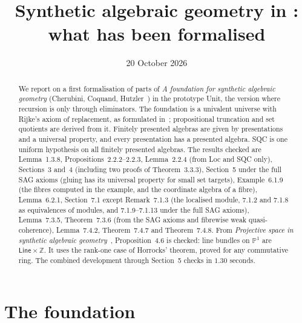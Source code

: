 \documentclass[11pt]{article}
\title{Synthetic algebraic geometry in \sys:\\what has been formalised}
\author{}
\date{20 October 2026}
\newcommand{\sys}{\textsf{Unit}\xspace}
\newcommand{\PP}{\mathbb{P}^1}
\theoremstyle{remark}
\begin{document}
\maketitle

\begin{abstract}
\noindent
We report on a first formalisation of parts of \emph{A foundation for
synthetic algebraic geometry} (Cherubini, Coquand, Hutzler~\cite{SAG})
in the prototype \sys, the version where recursion is only through
eliminators. The foundation is a univalent universe with Rijke's axiom
of replacement, as formulated in~\cite{CavCoq}; propositional truncation
and set quotients are derived from it. Finitely presented algebras are
given by presentations and a universal property, and every presentation
has a presented algebra. SQC is one uniform hypothesis on all finitely
presented algebras. The results checked are Lemma~1.3.8,
Propositions~2.2.2--2.2.3, Lemma~2.2.4 (from Loc and SQC only),
Sections~3 and~4 (including
two proofs of Theorem~3.3.3), Section~5 under the full SAG
axioms (gluing has its universal property for small set targets),
Example~6.1.9 (the
fibres computed in the example, and the coordinate algebra of a fibre),
Lemma~6.2.1, Section~7.1 except Remark~7.1.3 (the localised module, 7.1.2 and 7.1.8 as
equivalences of modules, and 7.1.9--7.1.13 under the full SAG axioms),
Lemma~7.3.5, Theorem~7.3.6 (from the SAG axioms and fibrewise weak
quasi-coherence), Lemma~7.4.2, Theorem~7.4.7 and
Theorem~7.4.8. From \emph{Projective space in synthetic algebraic
geometry}~\cite{Proj}, Proposition~4.6 is checked: line bundles on
$\PP$ are $\mathsf{Line}\times\mathbb Z$. It uses the rank-one case of
Horrocks' theorem, proved for any commutative ring. The combined development through Section~5 checks in
$1.30$ seconds.
\end{abstract}

\section{The foundation}
\end{document}
